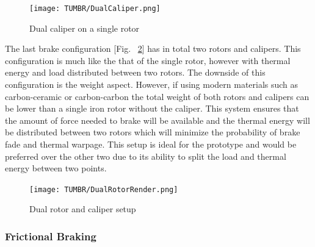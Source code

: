 \begin{figure}[H]
  \centering
  \texttt{[image: TUMBR/DualCaliper.png]}
  \caption{\label{fig:Dualcaliper}Dual caliper on a single rotor}
\end{figure}

\indent\indent The last brake configuration [Fig. ~\ref{fig:dualrotor}] has in total two rotors and calipers. This configuration is much like the that of the single rotor, however with thermal energy and load distributed between two rotors. The downside of this configuration is the weight aspect. However, if using modern materials such as carbon-ceramic or carbon-carbon the total weight of both rotors and calipers can be lower than a single iron rotor without the caliper. This system ensures that the amount of force needed to brake will be available and the thermal energy will be distributed between two rotors which will minimize the probability of brake fade and thermal warpage. This setup is ideal for the prototype and would be preferred over the other two due to its ability to split the load and thermal energy between two points. 

\begin{figure}[H]
  \centering
  \texttt{[image: TUMBR/DualRotorRender.png]}
  \caption{\label{fig:dualrotor}Dual rotor and caliper setup}
\end{figure}

\subsubsection{Frictional Braking}

